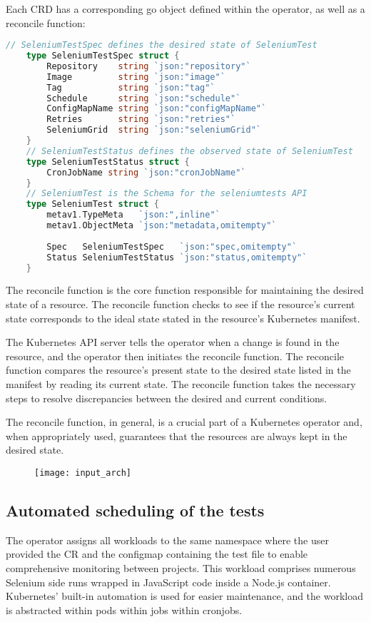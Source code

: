 Each CRD has a corresponding go object defined within the operator, as well as a reconcile function:

\begin{lstlisting}[language={Go}]
	// SeleniumTestSpec defines the desired state of SeleniumTest
	type SeleniumTestSpec struct {
		Repository    string `json:"repository"`
		Image         string `json:"image"`
		Tag           string `json:"tag"`
		Schedule      string `json:"schedule"`
		ConfigMapName string `json:"configMapName"`
		Retries       string `json:"retries"`
		SeleniumGrid  string `json:"seleniumGrid"`
	}
	// SeleniumTestStatus defines the observed state of SeleniumTest
	type SeleniumTestStatus struct {
		CronJobName string `json:"cronJobName"`
	}
	// SeleniumTest is the Schema for the seleniumtests API
	type SeleniumTest struct {
		metav1.TypeMeta   `json:",inline"`
		metav1.ObjectMeta `json:"metadata,omitempty"`
	
		Spec   SeleniumTestSpec   `json:"spec,omitempty"`
		Status SeleniumTestStatus `json:"status,omitempty"`
	}
\end{lstlisting}

The reconcile function is the core function responsible for maintaining the desired state of a resource. The reconcile function checks to see if the resource's current state corresponds to the ideal state stated in the resource's Kubernetes manifest.

The Kubernetes API server tells the operator when a change is found in the resource, and the operator then initiates the reconcile function. The reconcile function compares the resource's present state to the desired state listed in the manifest by reading its current state. The reconcile function takes the necessary steps to resolve discrepancies between the desired and current conditions.

The reconcile function, in general, is a crucial part of a Kubernetes operator and, when appropriately used, guarantees that the resources are always kept in the desired state.

\begin{figure}[H]
	\centering
	\texttt{[image: input\_arch]}
	\label{fig:input_arch}
\end{figure}

\subsection{Automated scheduling of the tests}

The operator assigns all workloads to the same namespace where the user provided the CR and the configmap containing the test file to enable comprehensive monitoring between projects. This workload comprises numerous Selenium side runs wrapped in JavaScript code inside a Node.js container. Kubernetes' built-in automation is used for easier maintenance, and the workload is abstracted within pods within jobs within cronjobs.

